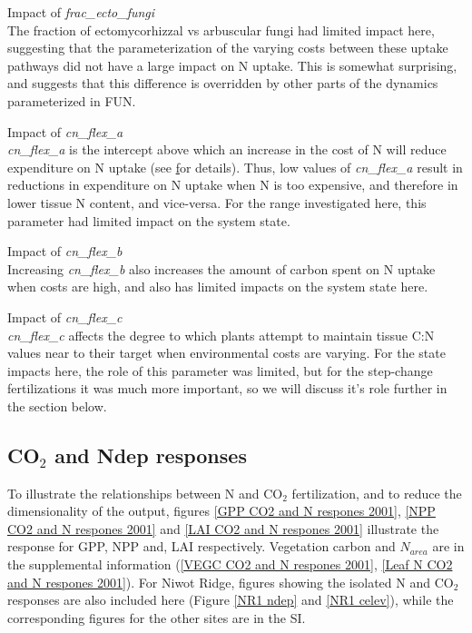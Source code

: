 \documentclass[draft,linenumbers]{agujournal}
\begin{document}
Impact of \emph{frac\_ecto\_fungi}\\
The fraction of ectomycorhizzal vs arbuscular fungi had limited impact here, suggesting that the parameterization of the varying costs between these uptake pathways did not have a large impact on N uptake. This is somewhat surprising, and suggests that this difference is overridden by other parts of the dynamics parameterized in FUN.

Impact of \emph{cn\_flex\_a}\\
\emph{cn\_flex\_a}  is the intercept above which an increase in the cost of N will reduce expenditure on N uptake (see \href{https://escomp.github.io/ctsm-docs/doc/build/html/tech_note/FUN/CLM50_Tech_Note_FUN.html#modifications-to-allow-variation-in-c-n-ratios} for details). Thus, low values of \emph{cn\_flex\_a}  result in reductions in expenditure on N uptake when N is too expensive, and therefore in lower tissue N content, and vice-versa.   For the range investigated here, this parameter had limited impact on the system state. 

Impact of \emph{cn\_flex\_b}\\
Increasing \emph{cn\_flex\_b} also increases the amount of carbon spent on N uptake when costs are high, and also has limited impacts on the system state here.

Impact of \emph{cn\_flex\_c}\\
 \emph{cn\_flex\_c} affects the degree to which plants attempt to maintain tissue C:N values near to their target when environmental costs are varying. For the state impacts here, the role of this parameter was limited, but for the step-change fertilizations it was much more important, so we will discuss it's role further in the section below. 

\subsection{CO$_{2}$ and Ndep responses}

To illustrate the relationships between N and CO$_{2}$ fertilization, and to reduce the dimensionality of the output, figures \ref{GPP CO2 and N respones 2001}, \ref{NPP CO2 and N respones 2001} and \ref{LAI CO2 and N respones 2001} illustrate the response for GPP, NPP and, LAI respectively. Vegetation carbon and $N_{area}$ are in the supplemental information (\ref{VEGC CO2 and N respones 2001}, \ref{Leaf N CO2 and N respones 2001}).  For Niwot Ridge, figures showing the isolated N and CO$_{2}$ responses are also included here (Figure \ref{NR1 ndep} and \ref{NR1 celev}), while the corresponding figures for the other sites are in the SI.
\end{document}

